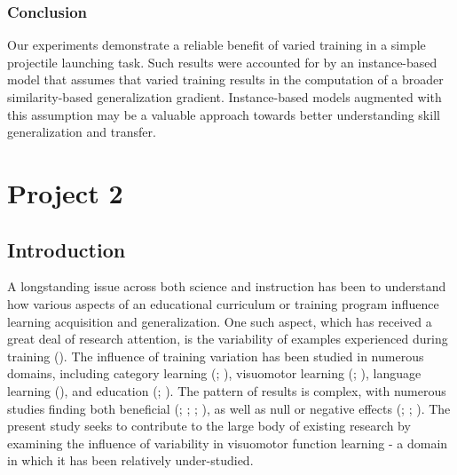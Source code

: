 \documentclass[
  11pt,
  letterpaper,
]{article}
\begin{document}
\subsubsection{Conclusion}\label{conclusion}

Our experiments demonstrate a reliable benefit of varied training in a
simple projectile launching task. Such results were accounted for by an
instance-based model that assumes that varied training results in the
computation of a broader similarity-based generalization gradient.
Instance-based models augmented with this assumption may be a valuable
approach towards better understanding skill generalization and transfer.

\newpage{}

\section{Project 2}\label{project-2}

\subsection{Introduction}\label{introduction-2}

A longstanding issue across both science and instruction has been to
understand how various aspects of an educational curriculum or training
program influence learning acquisition and generalization. One such
aspect, which has received a great deal of research attention, is the
variability of examples experienced during training
(). The
influence of training variation has been studied in numerous domains,
including category learning
(; ), visuomotor learning
(; ),
language learning (), and education
(; ). The pattern of results is complex, with numerous studies
finding both beneficial
(;
;
; ), as well as null or negative effects
(; ; ). The present study seeks to contribute to the large body of
existing research by examining the influence of variability in
visuomotor function learning - a domain in which it has been relatively
under-studied.
\end{document}
